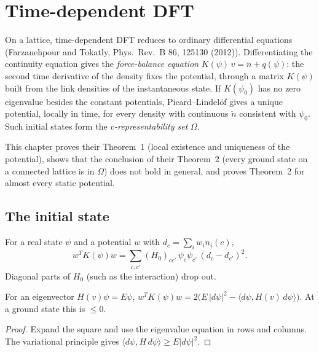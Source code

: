 \chapter{Time-dependent DFT}
\label{chap:tddft}

On a lattice, time-dependent DFT reduces to ordinary differential equations (Farzanehpour and Tokatly,
Phys.\ Rev.\ B 86, 125130 (2012)). Differentiating the continuity equation gives the \emph{force-balance
equation} $K(\psi)\,v=\ddot n+q(\psi)$: the second time derivative of the density fixes the potential,
through a matrix $K(\psi)$ built from the link densities of the instantaneous state. If $K(\psi_0)$ has no
zero eigenvalue besides the constant potentials, Picard--Lindel\"of gives a unique potential, locally in
time, for every density with continuous $\ddot n$ consistent with $\psi_0$. Such initial states form the
\emph{$v$-representability set} $\Omega$.

This chapter proves their Theorem~1 (local existence and uniqueness of the potential), shows that the conclusion of
their Theorem~2 (every ground state on a connected lattice is in $\Omega$) does not hold in general, and proves
Theorem~2 for almost every static potential.

\section{The initial state}

\begin{definition}
  \label{def:kMat}
  \leanok
  For a real state $\psi$ and a potential $w$ with $d_c=\sum_iw_in_i(c)$,
  \[
    w^TK(\psi)w=\sum_{c,c'}(H_0)_{cc'}\,\psi_c\psi_{c'}\,(d_c-d_{c'})^2 .
  \]
  Diagonal parts of $H_0$ (such as the interaction) drop out.
\end{definition}

\begin{theorem}
  \label{thm:kMat_nonpos}
  \leanok
  For an eigenvector $H(v)\psi=E\psi$, $w^TK(\psi)w=2\big(E\,|d\psi|^2-\langle d\psi,H(v)\,d\psi\rangle\big)$.
  At a ground state this is $\le0$.
\end{theorem}
\begin{proof}
  \leanok
  Expand the square and use the eigenvalue equation in rows and columns. The variational principle gives
  $\langle d\psi,H\,d\psi\rangle\ge E|d\psi|^2$.
\end{proof}


